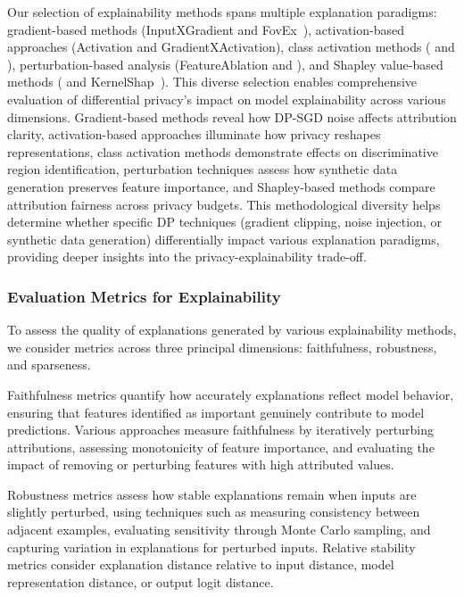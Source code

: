 \documentclass{article}
\begin{document}
Our selection of explainability methods spans multiple explanation paradigms: gradient-based methods (InputXGradient and FovEx~\cite{panda2024human}), activation-based approaches (Activation and GradientXActivation), class activation methods (\cite{selvaraju2017grad} and \cite{soomro2024grad++}), perturbation-based analysis (FeatureAblation and \cite{zeiler2013visualizingunderstandingconvolutionalnetworks}), and Shapley value-based methods (\cite{lundberg2017unified} and KernelShap~\cite{lundberg2017unified}). This diverse selection enables comprehensive evaluation of differential privacy's impact on model explainability across various dimensions. Gradient-based methods reveal how DP-SGD\cite{abadi2016deep} noise affects attribution clarity, activation-based approaches illuminate how privacy reshapes representations, class activation methods demonstrate effects on discriminative region identification, perturbation techniques assess how synthetic data generation preserves feature importance, and Shapley-based methods compare attribution fairness across privacy budgets. This methodological diversity helps determine whether specific DP techniques (gradient clipping, noise injection, or synthetic data generation) differentially impact various explanation paradigms, providing deeper insights into the privacy-explainability trade-off.

\subsubsection{Evaluation Metrics for Explainability}\label{app:eva_method_selection}
To assess the quality of explanations generated by various explainability methods, we consider metrics across three principal dimensions: faithfulness, robustness, and sparseness. 

Faithfulness metrics quantify how accurately explanations reflect model behavior, ensuring that features identified as important genuinely contribute to model predictions. Various approaches measure faithfulness by iteratively perturbing attributions, assessing monotonicity of feature importance, and evaluating the impact of removing or perturbing features with high attributed values.

Robustness metrics assess how stable explanations remain when inputs are slightly perturbed, using techniques such as measuring consistency between adjacent examples, evaluating sensitivity through Monte Carlo sampling, and capturing variation in explanations for perturbed inputs. Relative stability metrics consider explanation distance relative to input distance, model representation distance, or output logit distance. 
\end{document}
